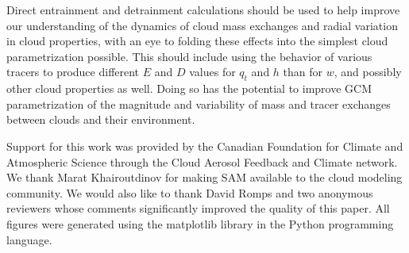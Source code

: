 \documentclass[12pt]{article}
\begin{document}
Direct entrainment and detrainment calculations should be used to help 
improve our understanding of the dynamics of cloud mass exchanges and 
radial variation in cloud properties, with an eye to folding these effects
into the simplest cloud parametrization possible.  This should include 
using the behavior of various tracers to produce different $E$ and $D$ 
values for $q_t$ and $h$ than for $w$, and possibly other cloud properties 
as well.  Doing so has the potential to improve GCM parametrization of the 
magnitude and variability of mass and tracer exchanges between clouds and
their environment.

\begin{acknowledgment} 
Support for this work was provided by the Canadian Foundation for Climate and 
Atmospheric Science through the Cloud Aerosol Feedback and Climate network.
We thank Marat Khairoutdinov for making SAM available to the cloud modeling 
community.  We would also like to thank David Romps and two anonymous 
reviewers whose comments significantly improved the quality of this paper.  
All figures were generated using the matplotlib library in the Python 
programming language.
\end{acknowledgment}
\end{document}
